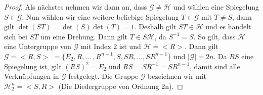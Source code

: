 \begin{proof}
Als nächstes nehmen wir dann an, dass $\mathcal{G} \neq \mathcal{H}$ und wählen eine Spiegelung $S \in \mathcal{G}$. Nun wählen wir eine weitere beliebige Spiegelung $T \in \mathcal{G}$ mit $T \neq S$, dann gilt $\det(ST)=\det(S)\det(T)=1$. Deshalb gilt $ST \in \mathcal{H}$ und es handelt sich bei $ST$ um eine Drehung. Dann gilt $T \in S\mathcal{H}$, da $S^{-1}=S$. So gilt, dass $\mathcal{H}$ eine Untergruppe von $\mathcal{G}$ mit Index $2$ ist und $\mathcal{H}=<R>$. Dann gilt $\mathcal{G}=<R,S>$ $=\{E_2,R,\dots \ ,R^{n-1},S,SR,\dots ,SR^{n-1}$\} und $|\mathcal{G}|=2n$. Da $RS$ eine Spiegelung ist, gilt $(RS)^2=E_2$ und $RS=SR^{-1}=SR^{n-1}$, damit sind alle Verknüpfungen in $\mathcal{G}$ festgelegt. Die Gruppe $\mathcal{G}$ bezeichnen wir mit $\mathcal{H}^n_2=<S,R>$ (Die Diedergruppe von Ordnung 2n).                                                                                                                                                                                                                                                                                                                                                           
\end{proof}

